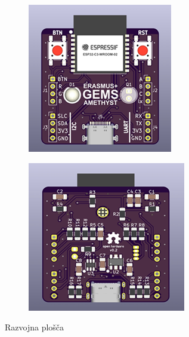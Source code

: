 \begin{figure}[H]
\centering
\begin{subfigure}{.4\textwidth}
  \centering
  \includegraphics[width=.9\linewidth]{Imgs/board1.png}
\end{subfigure}
\begin{subfigure}{.4\textwidth}
  \centering
  \includegraphics[width=.9\linewidth]{Imgs/board2.png}
\end{subfigure}
\caption{Razvojna plošča}
\end{figure}


